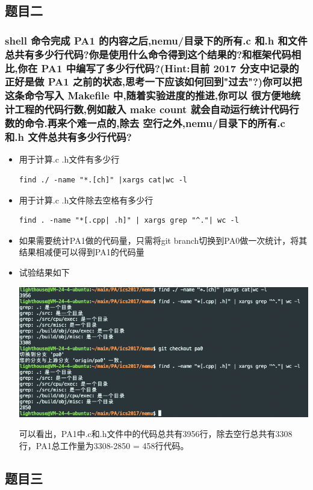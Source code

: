 \documentclass[UTF8,a4paper,10pt]{ctexart}
\begin{document}
\subsection{题目二}
\subsubsection*{shell 命令完成 PA1 的内容之后,nemu/目录下的所有.c 和.h 和文件总共有多少行代码?你是使用什么命令得到这个结果的?和框架代码相比,你在 PA1 中编写了多少行代码?(Hint:目前 2017 分支中记录的正好是做 PA1 之前的状态,思考一下应该如何回到"过去"?)你可以把这条命令写入 Makefile 中,随着实验进度的推进,你可以 很方便地统计工程的代码行数,例如敲入 make count 就会自动运行统计代码行数的命令.再来个难一点的,除去 空行之外,nemu/目录下的所有.c 和.h 文件总共有多少行代码?}
\begin{itemize}
  \item 用于计算.c .h文件有多少行
  \begin{lstlisting}
find ./ -name "*.[ch]" |xargs cat|wc -l
  \end{lstlisting}
  \item 用于计算.c .h文件除去空格有多少行
  \begin{lstlisting}
find . -name "*[.cpp| .h]" | xargs grep "^."| wc -l
  \end{lstlisting}
  \item 如果需要统计PA1做的代码量，只需将git branch切换到PA0做一次统计，将其结果相减便可以得到PA1的代码量
  \item 试验结果如下
  \begin{center}
    \includegraphics[scale = 0.4]{11}
  \end{center}
  可以看出，PA1中.c和.h文件中的代码总共有3956行，除去空行总共有3308行，PA1总工作量为3308-2850 = 458行代码。
\end{itemize}
\subsection{题目三}
\end{document}
